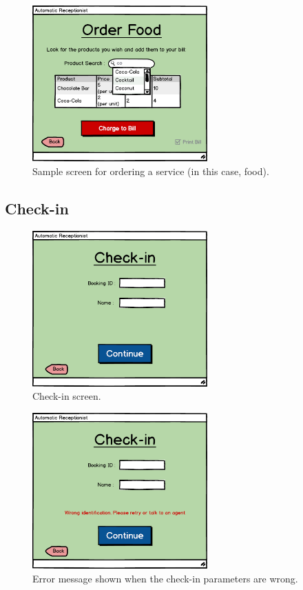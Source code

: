 \documentclass{article}
\begin{document}
\begin{figure}[H]
\centering
\includegraphics[width=0.6\textwidth]{Images/Services_5_Order-Food.png}
\caption{Sample screen for ordering a service (in this case, food).}
\label{figServicesOrder}
\end{figure}

\subsection{Check-in}

\begin{figure}[H]
\centering
\includegraphics[width=0.6\textwidth]{Images/Basic_3_Check-in.png}
\caption{Check-in screen.}
\label{figCheckIn}
\end{figure}

\begin{figure}[H]
\centering
\includegraphics[width=0.6\textwidth]{Images/Basic_3_Check-in__wrong.png}
\caption{Error message shown when the check-in parameters are wrong.}
\label{figCheckInWrong}
\end{figure}
\end{document}
